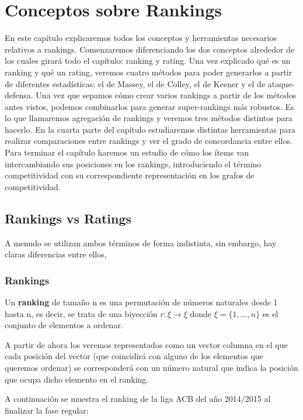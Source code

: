 \chapter{Conceptos sobre Rankings}
En este capítulo explicaremos todos los conceptos y herramientas necesarios relativos a rankings. Comenzaremos diferenciando los dos conceptos alrededor de los cuales girará todo el capítulo: ranking y rating. Una vez explicado qué es un ranking y qué un rating, veremos cuatro métodos para poder generarlos a partir de diferentes estadísticas: el de Massey, el de Colley, el de Keener y el de ataque-defensa. Una vez que sepamos cómo crear varios rankings a partir de los métodos antes vistos, podemos combinarlos para generar super-rankings más robustos. Es lo que llamaremos agregación de rankings y veremos tres métodos distintos para hacerlo. En la cuarta parte del capítulo estudiaremos distintas herramientas para realizar comparaciones entre rankings y ver el grado de concordancia entre ellos. Para terminar el capítulo haremos un estudio de cómo los ítems van intercambiando sus posiciones en los rankings, introduciendo el término competitividad con su correspondiente representación en los grafos de competitividad. 

\section{Rankings vs Ratings}
A menudo se utilizan ambos términos de forma indistinta, sin embargo, hay claras diferencias entre ellos, \cite[Chapter 1]{libro_rankings}

\subsection{Rankings}
\begin{defi} 
	Un \textbf{ranking} de tamaño n es una permutación de números naturales desde 1 hasta n, es decir, se trata de una biyección $r: \xi \rightarrow \xi$ donde $\xi = \{1,...,n\}$ es el conjunto de elementos a ordenar.
\end{defi}
A partir de ahora los veremos representados como un vector columna en el que cada posición del vector (que coincidirá con alguno de los elementos que queremos ordenar) se corresponderá con un número natural que indica la posición que ocupa dicho elemento en el ranking. 
 
\newpage 
 
\begin{ejem} \label{ejem1}
A continuación se muestra el ranking de la liga ACB del año 2014/2015 al finalizar la fase regular:
\end{ejem}
	
